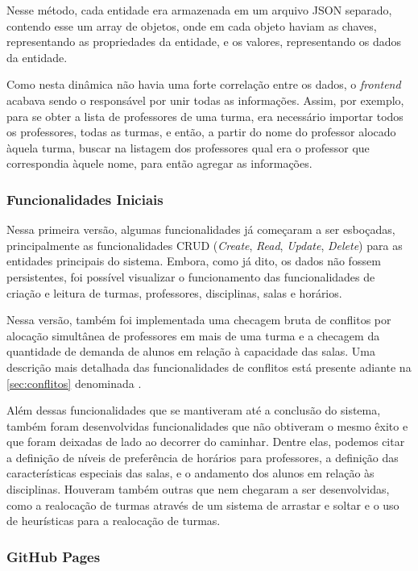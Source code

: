 Nesse método, cada entidade era armazenada em um arquivo JSON separado, contendo esse um array de objetos, onde em cada objeto haviam as chaves, representando as propriedades da entidade, e os valores, representando os dados da entidade.

Como nesta dinâmica não havia uma forte correlação entre os dados, o \textit{frontend} acabava sendo o responsável por unir todas as informações. Assim, por exemplo, para se obter a lista de professores de uma turma, era necessário importar todos os professores, todas as turmas, e então, a partir do nome do professor alocado àquela turma, buscar na listagem dos professores qual era o professor que correspondia àquele nome, para então agregar as informações.

\subsubsection{Funcionalidades Iniciais} \label{sssec:Funcionalidades Iniciais}

Nessa primeira versão, algumas funcionalidades já começaram a ser esboçadas, principalmente as funcionalidades CRUD (\textit{Create}, \textit{Read}, \textit{Update}, \textit{Delete}) para as entidades principais do sistema. Embora, como já dito, os dados não fossem persistentes, foi possível visualizar o funcionamento das funcionalidades de criação e leitura de turmas, professores, disciplinas, salas e horários.

Nessa versão, também foi implementada uma checagem bruta de conflitos por alocação simultânea de professores em mais de uma turma e a checagem da quantidade de demanda de alunos em relação à capacidade das salas. Uma descrição mais detalhada das funcionalidades de conflitos está presente adiante na \autoref{sec:conflitos} denominada .

Além dessas funcionalidades que se mantiveram até a conclusão do sistema, também foram desenvolvidas funcionalidades que não obtiveram o mesmo êxito e que foram deixadas de lado ao decorrer do caminhar. Dentre elas, podemos citar a definição de níveis de preferência de horários para professores, a definição das características especiais das salas, e o andamento dos alunos em relação às disciplinas. Houveram também outras que nem chegaram a ser desenvolvidas, como a realocação de turmas através de um sistema de arrastar e soltar e o uso de heurísticas para a realocação de turmas.

\subsubsection{GitHub Pages} \label{sssec:GitHub Pages}

